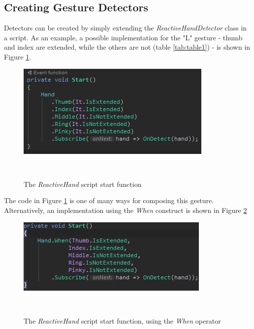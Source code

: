 \documentclass{sigchi}
\begin{document}
\subsection{Creating Gesture Detectors}

Detectors can be created by simply extending the \textit{ReactiveHandDetector} class in a script. As an example, a possible implementation for the "L" gesture - thumb and index are extended, while the others are not (table \ref{tab:table1}) - is shown in Figure \ref{fig:figure8}.

\begin{figure}[!b]
  \centering
  \includegraphics[width=0.9\columnwidth]{figures/FluentMotion_script}
  \caption{The \textit{ReactiveHand} script start function}~\label{fig:figure8}
\end{figure}

The code in Figure \ref{fig:figure8} is one of many ways for composing this gesture. Alternatively, an implementation using the \textit{When} construct is shown in Figure \ref{fig:figure9}

\begin{figure}[!b]
  \centering
  \includegraphics[width=0.9\columnwidth]{figures/FluentMotion_script_alternative}
  \caption{The \textit{ReactiveHand} script start function, using the \textit{When} operator}~\label{fig:figure9}
\end{figure}
\end{document}
